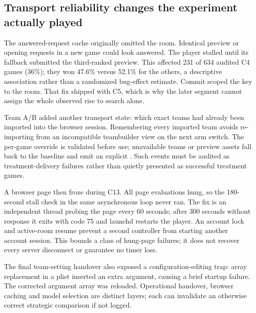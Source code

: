 
\subsection{Transport reliability changes the experiment actually played}
The answered-request cache originally omitted the room. Identical preview
or opening requests in a new game could look answered. The player stalled
until its fallback submitted the third-ranked preview. This affected 231 of
634 audited C4 games (36\%); they won 47.6\% versus 52.1\% for the others,
a descriptive association rather than a randomized bug-effect estimate.
Commit  scoped the key to the room. That fix shipped with C5,
which is why the later segment cannot assign the whole observed rise to
search alone.

Team A/B added another transport state: which exact teams had already been
imported into the browser session. Remembering every imported team avoids
re-importing from an incompatible teambuilder view on the next arm switch.
The per-game override is validated before use; unavailable teams or preview
assets fall back to the baseline and emit an explicit .
Such events must be audited as treatment-delivery failures rather than
quietly presented as successful treatment games.

A browser page then froze during C13. All page evaluations hung, so the
180-second stall check in the same asynchronous loop never ran. The fix is
an independent thread probing the page every 60 seconds; after 300 seconds
without response it exits with code 75 and launchd restarts the player.
An account lock and active-room resume prevent a second controller from
starting another account session. This bounds a class of hung-page failures;
it does not recover every server disconnect or guarantee no timer loss.

The final team-setting handover also exposed a configuration-editing trap:
array replacement in a plist inserted an extra argument, causing a brief
startup failure. The corrected argument array was reloaded. Operational
handover, browser caching and model selection are distinct layers; each can
invalidate an otherwise correct strategic comparison if not logged.


